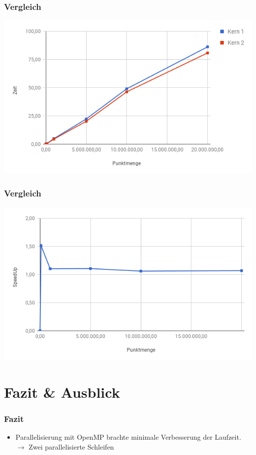 \documentclass[xcolor=dvipsnames]{beamer}
\begin{document}
\begin{frame}\frametitle{Vergleich}
	\includegraphics[width=1.0\textwidth,valign=t]{pictures/zeit_punktmenge}
\end{frame}

\begin{frame}\frametitle{Vergleich}
	\includegraphics[width=1.0\textwidth,valign=t]{pictures/speedup_punktmenge}
\end{frame}

\section{Fazit \& Ausblick}
\frame{\tableofcontents[current]}

\begin{frame}\frametitle{Fazit}
{\Large 	\begin{itemize}
		\item Parallelisierung mit OpenMP brachte minimale Verbesserung der Laufzeit.\newline
			$\rightarrow$ Zwei parallelisierte Schleifen
	\end{itemize}}
\end{frame}
\end{document}
